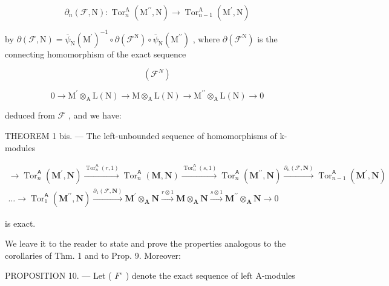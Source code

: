 \[
\partial_ {n} (\mathcal {F}, \mathrm{N}): \operatorname{Tor} _ {n} ^ {\mathrm{A}} \left(\mathrm{M} ^ {\prime \prime}, \mathrm{N}\right)\rightarrow \operatorname{Tor} _ {n - 1} ^ {\mathrm{A}} \left(\mathrm{M} ^ {\prime}, \mathrm{N}\right)
\]

by \(\partial(\mathcal{F},\mathrm{N})=\overline{\psi}_{\mathrm{N}}(\mathrm{M}^{\prime})^{-1}\circ\partial(\mathcal{F}^{\mathrm{N}})\circ\overline{\psi}_{\mathrm{N}}(\mathrm{M}^{\prime\prime})\) , where \(\partial(\mathcal{F}^{\mathrm{N}})\) is the connecting homomorphism of the exact sequence

\[
(\mathcal {F} ^ {N})
\]

\[
0 \rightarrow \mathrm{M} ^ {\prime} \otimes_ {\mathrm{A}} \mathrm{L} (\mathrm{N}) \rightarrow \mathrm{M} \otimes_ {\mathrm{A}} \mathrm{L} (\mathrm{N}) \rightarrow \mathrm{M} ^ {\prime \prime} \otimes_ {\mathrm{A}} \mathrm{L} (\mathrm{N}) \rightarrow 0
\]

deduced from \(\mathcal{F}\) , and we have:

THEOREM 1 bis. --- The left-unbounded sequence of homomorphisms of k-modules

\[
\begin{array}{l}\rightarrow \operatorname{Tor} _ {n} ^ {\mathsf {A}} (\mathbf {M} ^ {\prime}, \mathbf {N}) \xrightarrow {\operatorname{Tor} _ {n} ^ {\mathsf {A}} (r , 1)} \operatorname{Tor} _ {n} ^ {\mathsf {A}} (\mathbf {M}, \mathbf {N}) \xrightarrow {\operatorname{Tor} _ {n} ^ {\mathsf {A}} (s , 1)} \operatorname{Tor} _ {n} ^ {\mathsf {A}} (\mathbf {M} ^ {\prime \prime}, \mathbf {N}) \xrightarrow {\partial_ {n} (\mathcal {F} , \mathbf {N})} \operatorname{Tor} _ {n - 1} ^ {\mathsf {A}} (\mathbf {M} ^ {\prime}, \mathbf {N})\\\dots \rightarrow \operatorname{Tor} _ {1} ^ {\mathsf {A}} (\mathbf {M} ^ {\prime \prime}, \mathbf {N}) \xrightarrow {\partial_ {1} (\mathcal {F} , \mathbf {N})} \mathbf {M} ^ {\prime} \otimes_ {\mathbf {A}} \mathbf {N} \xrightarrow {r \otimes 1} \mathbf {M} \otimes_ {\mathbf {A}} \mathbf {N} \xrightarrow {s \otimes 1} \mathbf {M} ^ {\prime \prime} \otimes_ {\mathbf {A}} \mathbf {N} \longrightarrow 0\end{array}
\]

is exact.

We leave it to the reader to state and prove the properties analogous to the corollaries of Thm. 1 and to Prop. 9. Moreover:

PROPOSITION 10. --- Let ( \(F^{\circ}\) ) denote the exact sequence of left A-modules

